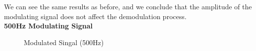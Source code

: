 \documentclass[12pt]{article}
\begin{document}
We can see the same results as before, and we conclude that the amplitude of the modulating signal does not affect the demodulation process. \\
\textbf{500Hz Modulating Signal}
\begin{figure}[H]
    \centering
    \caption{Modulated Singal (500Hz)}
\end{figure}
\end{document}
